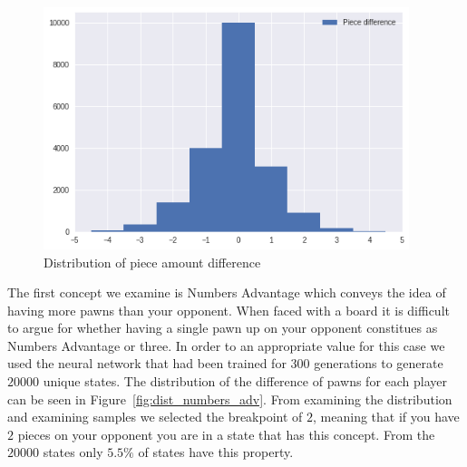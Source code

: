 \begin{figure}
    \begin{small}
        \begin{center}
            \includegraphics[width=0.95\textwidth]{graphics/dist_number_adv}
        \end{center}
    \end{small}
    \caption{Distribution of piece amount difference}
    \label{fig:dist_number_adv}
\end{figure}

The first concept we examine is Numbers Advantage which conveys the idea of having more pawns than your opponent. When faced with a board it is difficult to argue for whether having a single pawn up on your opponent constitues as Numbers Advantage or three. In order to an appropriate value for this case we used the neural network that had been trained for $300$ generations to generate $20000$ unique states. The distribution of the difference of pawns for each player can be seen in Figure~\ref{fig:dist_numbers_adv}. From examining the distribution and examining samples we selected the breakpoint of $2$, meaning that if you have $2$ pieces on your opponent you are in a state that has this concept. From the $20000$ states only $5.5\%$ of states have this property.

